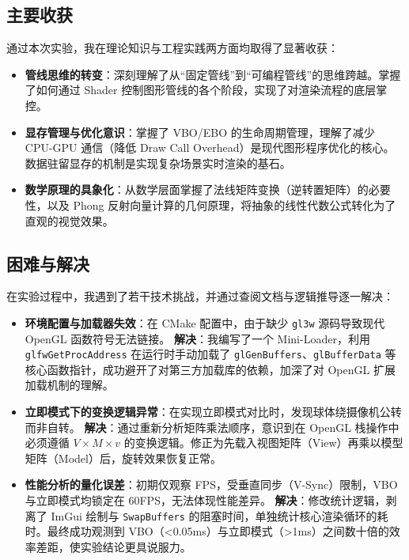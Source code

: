 \documentclass[a4paper]{article}
\begin{document}
\subsection{主要收获}

通过本次实验，我在理论知识与工程实践两方面均取得了显著收获：
\begin{itemize}
    \item \textbf{管线思维的转变}：深刻理解了从“固定管线”到“可编程管线”的思维跨越。掌握了如何通过 Shader 控制图形管线的各个阶段，实现了对渲染流程的底层掌控。
    \item \textbf{显存管理与优化意识}：掌握了 VBO/EBO 的生命周期管理，理解了减少 CPU-GPU 通信（降低 Draw Call Overhead）是现代图形程序优化的核心。数据驻留显存的机制是实现复杂场景实时渲染的基石。
    \item \textbf{数学原理的具象化}：从数学层面掌握了法线矩阵变换（逆转置矩阵）的必要性，以及 Phong 反射向量计算的几何原理，将抽象的线性代数公式转化为了直观的视觉效果。
\end{itemize}

\subsection{困难与解决}

在实验过程中，我遇到了若干技术挑战，并通过查阅文档与逻辑推导逐一解决：
\begin{itemize}
    \item \textbf{环境配置与加载器失效}：在 CMake 配置中，由于缺少 \texttt{gl3w} 源码导致现代 OpenGL 函数符号无法链接。
    \textbf{解决}：我编写了一个 Mini-Loader，利用 \texttt{glfwGetProcAddress} 在运行时手动加载了 \texttt{glGenBuffers}、\texttt{glBufferData} 等核心函数指针，成功避开了对第三方加载库的依赖，加深了对 OpenGL 扩展加载机制的理解。
    \item \textbf{立即模式下的变换逻辑异常}：在实现立即模式对比时，发现球体绕摄像机公转而非自转。
    \textbf{解决}：通过重新分析矩阵乘法顺序，意识到在 OpenGL 栈操作中必须遵循 $V \times M \times v$ 的变换逻辑。修正为先载入视图矩阵（View）再乘以模型矩阵（Model）后，旋转效果恢复正常。
    \item \textbf{性能分析的量化误差}：初期仅观察 FPS，受垂直同步（V-Sync）限制，VBO 与立即模式均锁定在 60FPS，无法体现性能差异。
    \textbf{解决}：修改统计逻辑，剥离了 ImGui 绘制与 \texttt{SwapBuffers} 的阻塞时间，单独统计核心渲染循环的耗时。最终成功观测到 VBO（<0.05ms）与立即模式（>1ms）之间数十倍的效率差距，使实验结论更具说服力。
\end{itemize}
\end{document}
